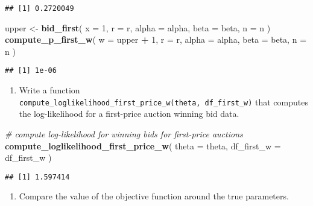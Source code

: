 \documentclass[
]{book}
\newenvironment{Shaded}{\begin{snugshade}}{\end{snugshade}}
\newcommand{\AttributeTok}[1]{\textcolor[rgb]{0.13,0.29,0.53}{#1}}
\newcommand{\CommentTok}[1]{\textcolor[rgb]{0.56,0.35,0.01}{\textit{#1}}}
\newcommand{\DecValTok}[1]{\textcolor[rgb]{0.00,0.00,0.81}{#1}}
\newcommand{\FunctionTok}[1]{\textcolor[rgb]{0.13,0.29,0.53}{\textbf{#1}}}
\newcommand{\NormalTok}[1]{#1}
\newcommand{\OtherTok}[1]{\textcolor[rgb]{0.56,0.35,0.01}{#1}}
\newcommand{\SpecialCharTok}[1]{\textcolor[rgb]{0.81,0.36,0.00}{\textbf{#1}}}
\providecommand{\tightlist}{%
  \setlength{\itemsep}{0pt}\setlength{\parskip}{0pt}}
\begin{document}
\begin{verbatim}
## [1] 0.2720049
\end{verbatim}

\begin{Shaded}
\begin{Highlighting}[]
\NormalTok{upper }\OtherTok{\textless{}{-}} 
  \FunctionTok{bid\_first}\NormalTok{(}
  \AttributeTok{x =} \DecValTok{1}\NormalTok{, }
  \AttributeTok{r =}\NormalTok{ r, }
  \AttributeTok{alpha =}\NormalTok{ alpha, }
  \AttributeTok{beta =}\NormalTok{ beta, }
  \AttributeTok{n =}\NormalTok{ n}
\NormalTok{  )}
\FunctionTok{compute\_p\_first\_w}\NormalTok{(}
  \AttributeTok{w =}\NormalTok{ upper }\SpecialCharTok{+} \DecValTok{1}\NormalTok{, }
  \AttributeTok{r =}\NormalTok{ r, }
  \AttributeTok{alpha =}\NormalTok{ alpha, }
  \AttributeTok{beta =}\NormalTok{ beta, }
  \AttributeTok{n =}\NormalTok{ n}
\NormalTok{  )}
\end{Highlighting}
\end{Shaded}

\begin{verbatim}
## [1] 1e-06
\end{verbatim}

\begin{enumerate}
\def\labelenumi{\arabic{enumi}.}
\setcounter{enumi}{6}
\tightlist
\item
  Write a function \texttt{compute\_loglikelihood\_first\_price\_w(theta,\ df\_first\_w)} that computes the log-likelihood for a first-price auction winning bid data.
\end{enumerate}

\begin{Shaded}
\begin{Highlighting}[]
\CommentTok{\# compute log{-}likelihood for winning bids for first{-}price auctions}
\FunctionTok{compute\_loglikelihood\_first\_price\_w}\NormalTok{(}
  \AttributeTok{theta =}\NormalTok{ theta, }
  \AttributeTok{df\_first\_w =}\NormalTok{ df\_first\_w}
\NormalTok{  )}
\end{Highlighting}
\end{Shaded}

\begin{verbatim}
## [1] 1.597414
\end{verbatim}

\begin{enumerate}
\def\labelenumi{\arabic{enumi}.}
\setcounter{enumi}{7}
\tightlist
\item
  Compare the value of the objective function around the true parameters.
\end{enumerate}
\end{document}
